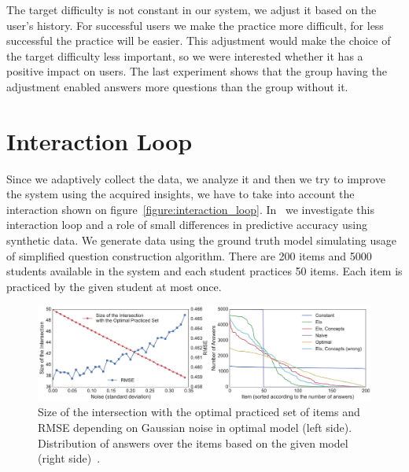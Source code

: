 \documentclass[table,color,cover,twoside,nolot,nolof]{fithesis3/fithesis3}
\begin{document}
The target difficulty is not constant in our system, we adjust it based on the
user's history. For successful users we make the practice more difficult, for
less successful the practice will be easier. This adjustment would make the
choice of the target difficulty less important, so we were interested whether
it has a positive impact on users. The last experiment shows that the group
having the adjustment enabled answers more questions than the group without it.

\section{Interaction Loop}

Since we adaptively collect the data, we analyze it and then we try to improve
the system using the acquired insights, we have to take into account the
interaction shown on figure~\ref{figure:interaction_loop}.
In~\cite{niznan2015exploring} we investigate this interaction loop and a role of
small differences in predictive accuracy using synthetic data. We generate data
using the ground truth model simulating usage of simplified question
construction algorithm. There are 200 items and 5000 students available in the
system and each student practices 50 items. Each item is practiced by the given
student at most once.

\begin{figure}[h]
	\begin{center}
		\includegraphics[width=\textwidth]{figure/noise_vs_intersection_number_of_answers}
		\caption{Size of the intersection with the optimal practiced set of items and RMSE
			depending on Gaussian noise in optimal model (left side). Distribution of answers over
			the items based on the given model (right side)~\cite{niznan2015exploring}.}
		\label{figure:feedback_by_success}
	\end{center}
\end{figure}
\end{document}

